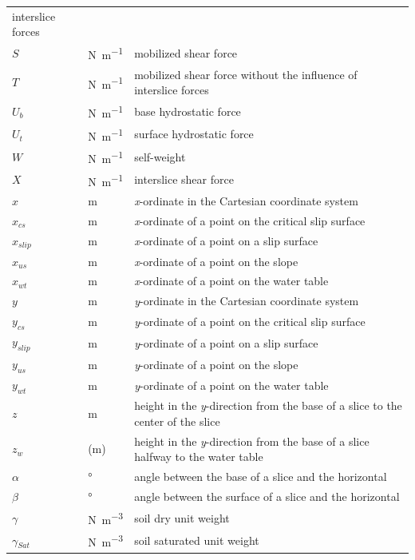 \documentclass[12pt]{article}
\begin{document}
\begin{longtable*}{  l  l  p{8.5cm}  }
interslice forces
\\
$S$ & \si{\newton\per\meter} & mobilized shear force
\\
$T$ & \si{\newton\per\meter} & mobilized shear force without the influence of 
interslice 
forces
\\
${U_{b}}$ & \si{\newton\per\meter} & base hydrostatic force
\\
${U_{t}}$ & \si{\newton\per\meter} & surface hydrostatic force
\\
$W$ & \si{\newton\per\meter} & self-weight
\\
$X$ & \si{\newton\per\meter} & interslice shear force
\\
$x$ & \si{\meter}& \textit{x}-ordinate in the Cartesian coordinate system
\\
$x_{cs}$ & \si{\meter} & \textit{x}-ordinate of a point on the critical slip 
surface
\\
${x_{slip}}$ &  \si{\meter}& \textit{x}-ordinate of a point on a slip surface
\\
${x_{us}}$ &  \si{\meter}& \textit{x}-ordinate of a point on the slope
\\
${x_{wt}}$ & \si{\meter} & \textit{x}-ordinate of a point on the water table
\\
$y$ &  \si{\meter}& \textit{y}-ordinate in the Cartesian coordinate system
\\
$y_{cs}$ & \si{\meter} & \textit{y}-ordinate of a point on the critical slip 
surface
\\
${y_{slip}}$ & \si{\meter}& \textit{y}-ordinate of a point on a slip surface
\\
${y_{us}}$ &  \si{\meter}& \textit{y}-ordinate of a point on the slope 
\\
${y_{wt}}$ &  \si{\meter}& \textit{y}-ordinate of a point on the water table
\\
$z$ & \si{\meter}& height in the \textit{y}-direction from the base of a slice 
to the center of the slice
\\
$z_w$ & (\si{\meter})& height in the \textit{y}-direction from the base of a 
slice halfway to the water table
\\
$\alpha{}$ & \si{\degree} & angle between the base of a slice and the horizontal
\\
$\beta{}$ &\si{\degree} & angle between the surface of a slice and the 
horizontal
\\
$\gamma{}$ & \si{\newton\per\cubic\meter} & soil dry unit weight
\\
${\gamma{}_{Sat}}$ &  \si{\newton\per\cubic\meter} & soil saturated unit weight

\end{longtable*}
\end{document}
